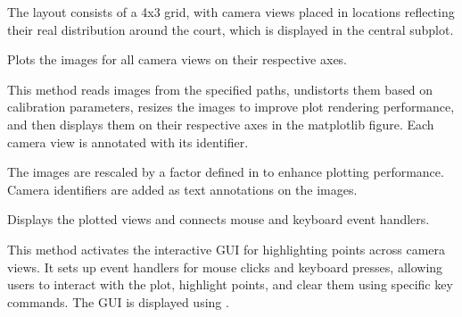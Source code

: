 \documentclass[letterpaper,10pt,english]{sphinxmanual}
\begin{document}
\begin{fulllineitems}
\begin{fulllineitems}
\sphinxAtStartPar
The layout consists of a 4x3 grid, with camera views placed in locations reflecting their real distribution around the court, which is displayed in the central subplot.

\end{fulllineitems}


\begin{fulllineitems}
\label{\detokenize{CameraUtils:id27}}
\pysigstartsignatures
{}
\pysigstopsignatures
\sphinxAtStartPar
Plots the images for all camera views on their respective axes.

\sphinxAtStartPar
This method reads images from the specified paths, undistorts them based on calibration parameters, resizes the images to improve plot rendering performance, and then displays them on their respective axes in the matplotlib figure. Each camera view is annotated with its identifier.

\sphinxAtStartPar
The images are rescaled by a factor defined in  to enhance plotting performance. Camera identifiers are added as text annotations on the images.

\end{fulllineitems}


\begin{fulllineitems}
\label{\detokenize{CameraUtils:id28}}
\pysigstartsignatures
{}
\pysigstopsignatures
\sphinxAtStartPar
Displays the plotted views and connects mouse and keyboard event handlers.

\sphinxAtStartPar
This method activates the interactive GUI for highlighting points across camera views. It sets up event handlers for mouse clicks and keyboard presses, allowing users to interact with the plot, highlight points, and clear them using specific key commands. The GUI is displayed using .

\end{fulllineitems}


\end{fulllineitems}
\end{document}
